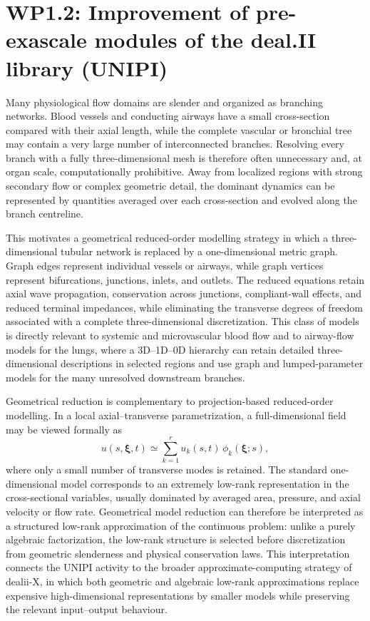 \documentclass[a4paper,12pt]{article}
\begin{document}
\newpage


\section{WP1.2: Improvement of pre-exascale modules of the deal.II library (UNIPI)}
\label{sec:unipi}
Many physiological flow domains are slender and organized as branching networks. Blood vessels and conducting airways have a small cross-section compared with their axial length, while the complete vascular or bronchial tree may contain a very large number of interconnected branches. Resolving every branch with a fully three-dimensional mesh is therefore often unnecessary and, at organ scale, computationally prohibitive. Away from localized regions with strong secondary flow or complex geometric detail, the dominant dynamics can be represented by quantities averaged over each cross-section and evolved along the branch centreline.

This motivates a geometrical reduced-order modelling strategy in which a three-dimensional tubular network is replaced by a one-dimensional metric graph. Graph edges represent individual vessels or airways, while graph vertices represent bifurcations, junctions, inlets, and outlets. The reduced equations retain axial wave propagation, conservation across junctions, compliant-wall effects, and reduced terminal impedances, while eliminating the transverse degrees of freedom associated with a complete three-dimensional discretization. This class of models is directly relevant to systemic and microvascular blood flow and to airway-flow models for the lungs, where a 3D--1D--0D hierarchy can retain detailed three-dimensional descriptions in selected regions and use graph and lumped-parameter models for the many unresolved downstream branches.

Geometrical reduction is complementary to projection-based reduced-order modelling. In a local axial--transverse parametrization, a full-dimensional field may be viewed formally as
\[
u(s,\boldsymbol{\xi},t) \simeq \sum_{k=1}^{r} u_k(s,t)\,\phi_k(\boldsymbol{\xi};s),
\]
where only a small number of transverse modes is retained. The standard one-dimensional model corresponds to an extremely low-rank representation in the cross-sectional variables, usually dominated by averaged area, pressure, and axial velocity or flow rate. Geometrical model reduction can therefore be interpreted as a structured low-rank approximation of the continuous problem: unlike a purely algebraic factorization, the low-rank structure is selected before discretization from geometric slenderness and physical conservation laws. This interpretation connects the UNIPI activity to the broader approximate-computing strategy of dealii-X, in which both geometric and algebraic low-rank approximations replace expensive high-dimensional representations by smaller models while preserving the relevant input--output behaviour.
\end{document}
